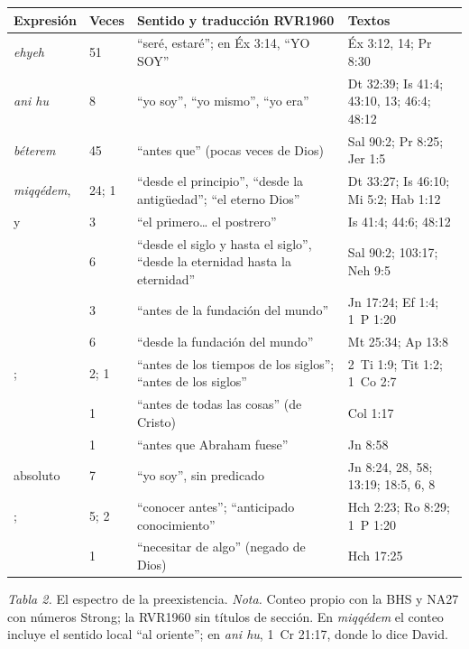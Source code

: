 \begin{center}\small\renewcommand{\arraystretch}{1.16}
\begin{tabular}{@{}L{3.7cm}L{1.0cm}L{5.4cm}L{4.3cm}@{}}
\toprule
\textbf{Expresión} & \textbf{Veces} & \textbf{Sentido y traducción RVR1960} & \textbf{Textos} \\ \midrule
{} \emph{ehyeh} & 51 & ``seré, estaré''; en Éx 3:14, ``YO SOY'' & Éx 3:12, 14; Pr 8:30 \\
 \emph{ani hu} & 8 & ``yo soy'', ``yo mismo'', ``yo era'' & Dt 32:39; Is 41:4; 43:10, 13; 46:4; 48:12 \\
 \emph{béterem} & 45 & ``antes que'' (pocas veces de Dios) & Sal 90:2; Pr 8:25; Jer 1:5 \\
 \emph{miqqédem},  & 24; 1 & ``desde el principio'', ``desde la antigüedad''; ``el eterno Dios'' & Dt 33:27; Is 46:10; Mi 5:2; Hab 1:12 \\
 y  & 3 & ``el primero\ldots{} el postrero'' & Is 41:4; 44:6; 48:12 \\
 & 6 & ``desde el siglo y hasta el siglo'', ``desde la eternidad hasta la eternidad'' & Sal 90:2; 103:17; Neh 9:5 \\ \midrule
{} & 3 & ``antes de la fundación del mundo'' & Jn 17:24; Ef 1:4; 1~P 1:20 \\
 & 6 & ``desde la fundación del mundo'' & Mt 25:34; Ap 13:8 \\
;  & 2; 1 & ``antes de los tiempos de los siglos''; ``antes de los siglos'' & 2~Ti 1:9; Tit 1:2; 1~Co 2:7 \\
 & 1 & ``antes de todas las cosas'' (de Cristo) & Col 1:17 \\
 & 1 & ``antes que Abraham fuese'' & Jn 8:58 \\
 absoluto & 7 & ``yo soy'', sin predicado & Jn 8:24, 28, 58; 13:19; 18:5, 6, 8 \\
;  & 5; 2 & ``conocer antes''; ``anticipado conocimiento'' & Hch 2:23; Ro 8:29; 1~P 1:20 \\
 & 1 & ``necesitar de algo'' (negado de Dios) & Hch 17:25 \\
\bottomrule
\end{tabular}\par
{\footnotesize\color{gris}\textit{Tabla 2.} El espectro de la preexistencia. \textit{Nota.} Conteo propio con la BHS y NA27 con números Strong; la RVR1960 sin títulos de sección. En \emph{miqqédem} el conteo incluye el sentido local ``al oriente''; en \emph{ani hu}, 1~Cr 21:17, donde lo dice David.}
\end{center}

